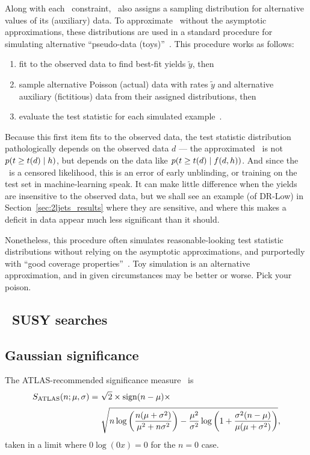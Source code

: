 Along with each \heplikelihood\ constraint, \histfactory\ also assigns a
sampling distribution for alternative values of its (auxiliary) data.
To approximate \pvalues\ without the asymptotic approximations,
these distributions are used in a standard procedure for simulating
alternative ``pseudo-data (toys)''~\cite{cern2011procedure}.
This procedure works as follows:
\begin{enumerate}
\item fit to the observed data to find best-fit yields $\tilde{y}$, then
\item sample alternative Poisson (actual) data with rates $\tilde{y}$ and
alternative auxiliary (fictitious) data from their assigned distributions,
then
\item evaluate the test statistic for each simulated
example~\cite{cern2011procedure}.
\end{enumerate}
Because this first item fits to the observed data, the test statistic
distribution pathologically depends on the observed data $d$ ---
the approximated \pvalue\ is not
$p(t \geq t(d) \mid h)$, but depends on the data like
$p(t \geq t(d) \mid f(d, h))$.
And since the \pvalue\ is a censored likelihood, this is an error of early
unblinding, or training on the test set in machine-learning speak.
It can make little difference when the yields are insensitive to the observed
data, but we shall see an example (of DR-Low) in
Section~\ref{sec:2ljets_results} where they are sensitive, and where
this makes a deficit in data appear much less significant than it should.

Nonetheless, this procedure often simulates reasonable-looking test statistic
distributions without relying on the asymptotic approximations, and purportedly
with ``good coverage properties''~\cite{
cern2011procedure,
Cranmer2006Statistical
}.
Toy simulation is an alternative approximation, and in given circumstances
may be better or worse.
Pick your poison.


\subsection{\atlas\ SUSY searches}
\label{sec:searches_searches}



\subsection{Gaussian significance}


The ATLAS-recommended significance measure~\cite{atlas_significance} is
\begin{align}
\label{eqn:significance_atlas}
S_\mathrm{ATLAS}(n; \mu, \sigma) =~&
\sqrt{2} \times
\mathrm{sign}(n - \mu) \times
\\[0.2em] \nonumber
&
\sqrt{
n\log\left(\frac{n(\mu + \sigma^2)}{\mu^2 + n\sigma^2}\right)
- \frac{\mu^2}{\sigma^2}\log\left(
1 + \frac{\sigma^2(n - \mu)}{\mu(\mu + \sigma^2)}
\right)
}
,
\end{align}
taken in a limit where $0\log(0x) = 0$ for the $n=0$ case.
